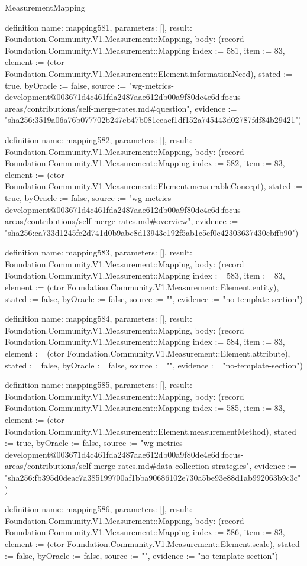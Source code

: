 \begin{lexlean}{MeasurementMapping}
\begin{semanticmodule}
definition{
  name: mapping581,
  parameters: [],
  result: Foundation.Community.V1.Measurement::Mapping,
  body: (record Foundation.Community.V1.Measurement::Mapping {index := 581, item := 83, element := (ctor Foundation.Community.V1.Measurement::Element.informationNeed), stated := true, byOracle := false, source := "wg-metrics-development@003671d4c461fda2487aae612db00a9f80de4e6d:focus-areas/contributions/self-merge-rates.md#question", evidence := "sha256:3519a06a76b077702b247cb47b081eeacf1df152a745443d02787fdf84b29421"})
}

definition{
  name: mapping582,
  parameters: [],
  result: Foundation.Community.V1.Measurement::Mapping,
  body: (record Foundation.Community.V1.Measurement::Mapping {index := 582, item := 83, element := (ctor Foundation.Community.V1.Measurement::Element.measurableConcept), stated := true, byOracle := false, source := "wg-metrics-development@003671d4c461fda2487aae612db00a9f80de4e6d:focus-areas/contributions/self-merge-rates.md#overview", evidence := "sha256:ca733d1245fe2d741d0b9abc8d13943e192f5ab1c5ef0e42303637430cbffb90"})
}

definition{
  name: mapping583,
  parameters: [],
  result: Foundation.Community.V1.Measurement::Mapping,
  body: (record Foundation.Community.V1.Measurement::Mapping {index := 583, item := 83, element := (ctor Foundation.Community.V1.Measurement::Element.entity), stated := false, byOracle := false, source := "", evidence := "no-template-section"})
}

definition{
  name: mapping584,
  parameters: [],
  result: Foundation.Community.V1.Measurement::Mapping,
  body: (record Foundation.Community.V1.Measurement::Mapping {index := 584, item := 83, element := (ctor Foundation.Community.V1.Measurement::Element.attribute), stated := false, byOracle := false, source := "", evidence := "no-template-section"})
}

definition{
  name: mapping585,
  parameters: [],
  result: Foundation.Community.V1.Measurement::Mapping,
  body: (record Foundation.Community.V1.Measurement::Mapping {index := 585, item := 83, element := (ctor Foundation.Community.V1.Measurement::Element.measurementMethod), stated := true, byOracle := false, source := "wg-metrics-development@003671d4c461fda2487aae612db00a9f80de4e6d:focus-areas/contributions/self-merge-rates.md#data-collection-strategies", evidence := "sha256:fb395d0deac7a385199700af1bba90686102e730a5be93e88d1ab992063b9c3c"})
}

definition{
  name: mapping586,
  parameters: [],
  result: Foundation.Community.V1.Measurement::Mapping,
  body: (record Foundation.Community.V1.Measurement::Mapping {index := 586, item := 83, element := (ctor Foundation.Community.V1.Measurement::Element.scale), stated := false, byOracle := false, source := "", evidence := "no-template-section"})
}


\end{semanticmodule}
\end{lexlean}
